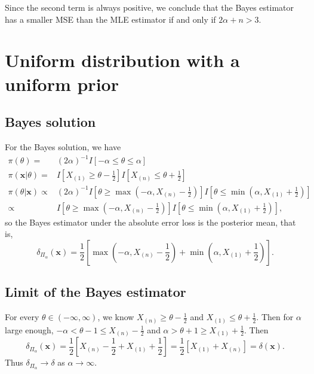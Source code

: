 \documentclass[12pt]{article}
\begin{document}
Since the second term is always positive,
we conclude that the Bayes estimator has a smaller MSE than the MLE estimator
if and only if $2\alpha + n > 3$.

\section{Uniform distribution with a uniform prior}

\subsection{Bayes solution}

For the Bayes solution, we have
\begin{align*}
  \pi(\theta)
  = &  (2\alpha)^{-1} I[-\alpha \leq \theta \leq \alpha] \\
  \pi(\bm{x} | \theta)
  = & I[X_{(1)} \geq \theta - \frac{1}{2}]
      I[X_{(n)} \leq \theta + \frac{1}{2}] \\
  \pi(\theta | \bm{x} )
  \propto & (2\alpha)^{-1}
            I[\theta \geq \max(-\alpha, X_{(n)} - \frac{1}{2})]
            I[\theta \leq \min(\alpha, X_{(1)} + \frac{1}{2})] \\
  \propto & I[\theta \geq \max(-\alpha, X_{(n)} - \frac{1}{2})]
            I[\theta \leq \min(\alpha, X_{(1)} + \frac{1}{2})],
\end{align*}
so the Bayes estimator under the absolute error loss is the posterior mean,
that is,
\[
  \delta_{\Pi_\alpha}(\bm{x})
  = \frac{1}{2}
  [
  \max(-\alpha, X_{(n)} - \frac{1}{2}) +
  \min(\alpha, X_{(1)} + \frac{1}{2})
  ].
\]

\subsection{Limit of the Bayes estimator}

For every $\theta \in (-\infty, \infty)$,
we know $X_{(n)} \geq \theta - \frac{1}{2}$
and $X_{(1)} \leq \theta + \frac{1}{2}$.
Then for $\alpha$ large enough,
$-\alpha < \theta -1 \leq X_{(n)} - \frac{1}{2}$ and
$\alpha > \theta + 1 \geq X_{(1)} + \frac{1}{2}$.
Then
\[
  \delta_{\Pi_\alpha}(\bm{x})
  = \frac{1}{2}
  [
  X_{(n)} - \frac{1}{2}
  + X_{(1)} + \frac{1}{2}
  ]
  = \frac{1}{2}[ X_{(1)} + X_{(n)}]
  = \delta(\bm{x}).
\]
Thus $\delta_{\Pi_\alpha} \to \delta$ as $\alpha \to \infty$. 
\end{document}
